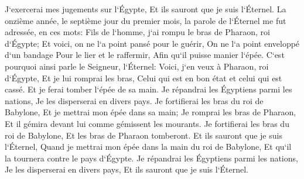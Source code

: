 \verse J`exercerai mes jugements sur l`Égypte, Et ils sauront que je suis l`Éternel. 
\verse La onzième année, le septième jour du premier mois, la parole de l`Éternel me fut adressée, en ces mots: 
\verse Fils de l`homme, j`ai rompu le bras de Pharaon, roi d`Égypte; Et voici, on ne l`a point pansé pour le guérir, On ne l`a point enveloppé d`un bandage Pour le lier et le raffermir, Afin qu`il puisse manier l`épée. 
\verse C`est pourquoi ainsi parle le Seigneur, l`Éternel: Voici, j`en veux à Pharaon, roi d`Égypte, Et je lui romprai les bras, Celui qui est en bon état et celui qui est cassé. Et je ferai tomber l`épée de sa main. 
\verse Je répandrai les Égyptiens parmi les nations, Je les disperserai en divers pays. 
\verse Je fortifierai les bras du roi de Babylone, Et je mettrai mon épée dans sa main; Je romprai les bras de Pharaon, Et il gémira devant lui comme gémissent les mourants. 
\verse Je fortifierai les bras du roi de Babylone, Et les bras de Pharaon tomberont. Et ils sauront que je suis l`Éternel, Quand je mettrai mon épée dans la main du roi de Babylone, Et qu`il la tournera contre le pays d`Égypte. 
\verse Je répandrai les Égyptiens parmi les nations, Je les disperserai en divers pays, Et ils sauront que je suis l`Éternel. 

